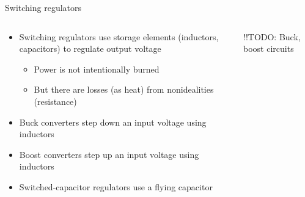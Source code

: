 \documentclass{beamer}
\begin{document}
\begin{frame}{Switching regulators}
  \begin{columns}[T]
    \begin{column}{.6\textwidth}
      \begin{itemize}
        \item Switching regulators use storage elements (inductors, capacitors) to regulate output voltage
        \begin{itemize}
          \item Power is not intentionally burned
          \item But there are losses (as heat) from nonidealities (resistance)
        \end{itemize}
        \item Buck converters step down an input voltage using inductors
        \item Boost converters step up an input voltage using inductors
        \item Switched-capacitor regulators use a flying capacitor
      \end{itemize}
    \end{column}

    \begin{column}{0.4\textwidth}
      !!TODO: Buck, boost circuits
    \end{column}
  \end{columns}
\end{frame}
\end{document}
